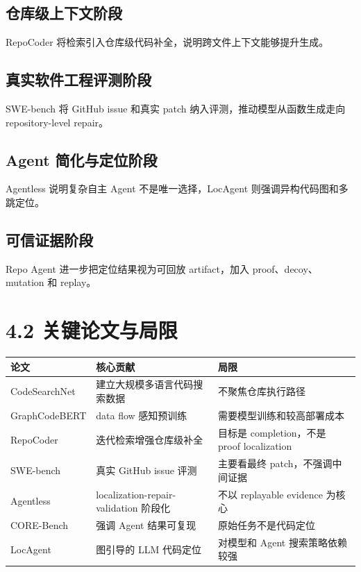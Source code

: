 \documentclass[UTF8,12pt,openany]{ctexbook}
\begin{document}
\subsection{仓库级上下文阶段}

RepoCoder 将检索引入仓库级代码补全，说明跨文件上下文能够提升生成。\par

\subsection{真实软件工程评测阶段}

SWE-bench 将 GitHub issue 和真实 patch 纳入评测，推动模型从函数生成走向 repository-level repair。\par

\subsection{Agent 简化与定位阶段}

Agentless 说明复杂自主 Agent 不是唯一选择，LocAgent 则强调异构代码图和多跳定位。\par

\subsection{可信证据阶段}

Repo Agent 进一步把定位结果视为可回放 artifact，加入 proof、decoy、mutation 和 replay。\par

\section{4.2 关键论文与局限}

\begin{center}
\small
\begin{longtable}{|p{}|p{}|p{}|}
\toprule
论文 & 核心贡献 & 局限 \\
\midrule
CodeSearchNet & 建立大规模多语言代码搜索数据 & 不聚焦仓库执行路径 \\
GraphCodeBERT & data flow 感知预训练 & 需要模型训练和较高部署成本 \\
RepoCoder & 迭代检索增强仓库级补全 & 目标是 completion，不是 proof localization \\
SWE-bench & 真实 GitHub issue 评测 & 主要看最终 patch，不强调中间证据 \\
Agentless & localization-repair-validation 阶段化 & 不以 replayable evidence 为核心 \\
CORE-Bench & 强调 Agent 结果可复现 & 原始任务不是代码定位 \\
LocAgent & 图引导的 LLM 代码定位 & 对模型和 Agent 搜索策略依赖较强 \\
\bottomrule
\end{longtable}
\end{center}
\end{document}
